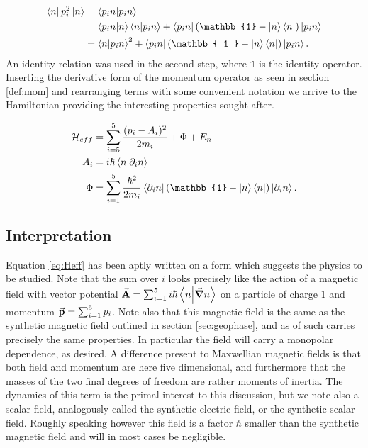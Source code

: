 \documentclass[a4paper]{article}
\begin{document}
\begin{align*}
        \bra{n} p_i^2\ket{n} &= \bra{p_i n} \ket{p_i n}\\
                                                 &=
                                                 \bra{p_i
                                                 n}\ket{n}\bra{n}\ket{p_i n}
                                                 + \bra{p_i n} (\mathbb{1} - \ket{n}
                                                 \bra{n}) \ket{p_i n}\\
                                                 &= \bra{n}\ket{p_i n}^2 +
                                                         \bra{p_i n} (\mathbb{ 1 } -
                                                         \ket{n}\bra{n})\ket{p_i
                                                         n}
.\end{align*}
An identity relation was used in the second step, where \(\mathbb{1}\) is the identity
operator.
Inserting the derivative form of the momentum operator as seen in section \ref{def:mom}
and rearranging terms with some convenient notation we arrive to the Hamiltonian providing the interesting properties
sought after.

\begin{align}\label{eq:Heff}
        \mathbb{\cal H}_{eff} &= \sum_{i=5}^{5} \frac{(p_i - A_i)^2}{2m_i} + \Phi + E_n\\
        A_i &= i\hbar{}\bra{n}\ket{\partial_i n}\\
        \Phi &= \sum_{i=1}^{5} \frac{\hbar{}^{2}}{2m_i}\bra{\partial_i n}(\mathbb{1} - \ket{n}
    \bra{n})\ket{\partial_i n}
.\end{align}
\subsection{Interpretation}\label{sec:BOinterp}
Equation \ref{eq:Heff} has been aptly written on a form which suggests the physics to be
studied. Note that the sum over \(i\) looks precisely like the action of a magnetic field
with vector potential \(\va{A} = \sum_{i=1}^{5} i\hbar{}\bra{n}\ket{\grad n}\) on a particle of charge
\(1\) and momentum \(\va{p} = \sum_{i=1}^{5} p_i\). Note also that this magnetic field is
the same as the synthetic magnetic field outlined in section \ref{sec:geophase}, and as of
such carries precisely the same properties. In particular the field will carry a monopolar
dependence, as desired. A difference present to Maxwellian magnetic fields is that both field and momentum are here five dimensional, and
furthermore that the masses of the two final degrees of freedom are rather moments of
inertia. The dynamics of this term is the
primal interest to this discussion, but we note also a scalar field, analogously called the
synthetic electric field, or the synthetic scalar field. Roughly speaking however this
field is a factor \(\hbar{}\) smaller than the synthetic magnetic field and will in most
cases be negligible. 
\end{document}
